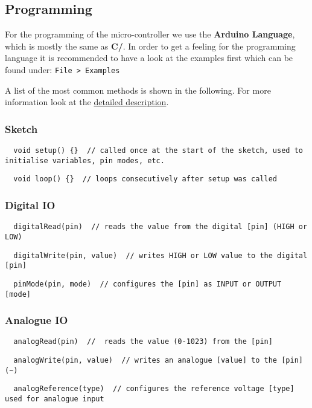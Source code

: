 \subsection{Programming}\label{sec:prog}
For the programming of the micro-controller we use the \textbf{Arduino Language}, which is mostly the same as \textbf{C/\cpp}. In order to get a feeling for the programming language it is recommended to have a look at the examples first which can be found under: \texttt{File > Examples}\par
%
A list of the most common methods is shown in the following. For more information look at the \href{https://www.arduino.cc/reference/en/}{detailed description}.
%
\subsubsection*{Sketch}
\begin{verbatim}
  void setup() {}  // called once at the start of the sketch, used to initialise variables, pin modes, etc.
\end{verbatim}
\vspace*{-2ex}
\begin{verbatim}
  void loop() {}  // loops consecutively after setup was called
\end{verbatim}
\newpage
\subsubsection*{Digital \ac{IO}}
\begin{verbatim}
  digitalRead(pin)  // reads the value from the digital [pin] (HIGH or LOW)
\end{verbatim}
\vspace*{-2ex}
\begin{verbatim}
  digitalWrite(pin, value)  // writes HIGH or LOW value to the digital [pin]
\end{verbatim}
\vspace*{-2ex}
\begin{verbatim}
  pinMode(pin, mode)  // configures the [pin] as INPUT or OUTPUT [mode]
\end{verbatim}
\subsubsection*{Analogue \ac{IO}}
\begin{verbatim}
  analogRead(pin)  //  reads the value (0-1023) from the [pin]
\end{verbatim}
\vspace*{-2ex}
\begin{verbatim}
  analogWrite(pin, value)  // writes an analogue [value] to the [pin] (~)
\end{verbatim}
\vspace*{-2ex}
\begin{verbatim}
  analogReference(type)  // configures the reference voltage [type] used for analogue input
\end{verbatim}
